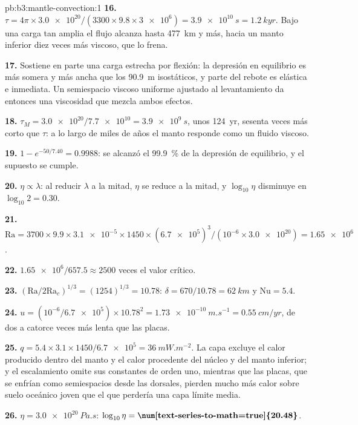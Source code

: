 \begin{solution}{pb:b3:mantle-convection:1}
\textbf{16.} $\tau = 4\pi\times\num{3.0e20}/(3300\times9.8\times\num{3e6}) =
\qty{3.9e10}{s} = \qty{1.2}{kyr}$. Bajo una carga tan amplia el flujo alcanza
hasta \qty{477}{km} y más, hacia un manto inferior diez veces más viscoso,
que lo frena.

\textbf{17.} Sostiene en parte una carga estrecha por flexión: la depresión en
equilibrio es más somera y más ancha que los \qty{90.9}{m} isostáticos, y parte
del rebote es elástica e inmediata. Un semiespacio viscoso uniforme ajustado al
levantamiento da entonces una viscosidad que mezcla ambos efectos.

\textbf{18.} $\tau_M = \num{3.0e20}/\num{7.7e10} = \qty{3.9e9}{s}$, unos
\qty{124}{yr}, sesenta veces más corto que $\tau$: a lo largo de miles de años el
manto responde como un fluido viscoso.

\textbf{19.} $1 - e^{-50/7.40} = 0.9988$: se alcanzó el \qty{99.9}{\percent} de la
depresión de equilibrio, y el supuesto se cumple.

\textbf{20.} $\eta \propto \lambda$: al reducir $\lambda$ a la mitad, $\eta$ se reduce a la mitad, y
$\log_{10}\eta$ disminuye en $\log_{10}2 = 0.30$.

\textbf{21.} $\mathrm{Ra} = 3700\times9.9\times\num{3.1e-5}\times1450\times
(\num{6.7e5})^3/(10^{-6}\times\num{3.0e20}) = \num{1.65e6}$.

\textbf{22.} $\num{1.65e6}/657.5 \approx 2500$ veces el valor crítico.

\textbf{23.} $(\mathrm{Ra}/2\mathrm{Ra}_c)^{1/3} = (1254)^{1/3} = 10.78$: $\delta
= 670/10.78 = \qty{62}{km}$ y $\mathrm{Nu} = 5.4$.

\textbf{24.} $u = (10^{-6}/\num{6.7e5})\times10.78^2 = \qty{1.73e-10}{m.s^{-1}}
= \qty{0.55}{cm/yr}$, de dos a catorce veces más lenta que las placas.

\textbf{25.} $q = 5.4\times3.1\times1450/\num{6.7e5} = \qty{36}{mW.m^{-2}}$. La
capa excluye el calor producido dentro del manto y el calor procedente del
núcleo y del manto inferior; y el escalamiento omite sus constantes de orden uno,
mientras que las placas, que se enfrían como semiespacios desde las dorsales, pierden mucho más calor sobre
suelo oceánico joven que el que perdería una capa límite media.

\textbf{26.} $\eta = \qty{3.0e20}{Pa.s}$: $\log_{10}\eta =
\textbf{\num[text-series-to-math=true]{20.48}}$.
\end{solution}
